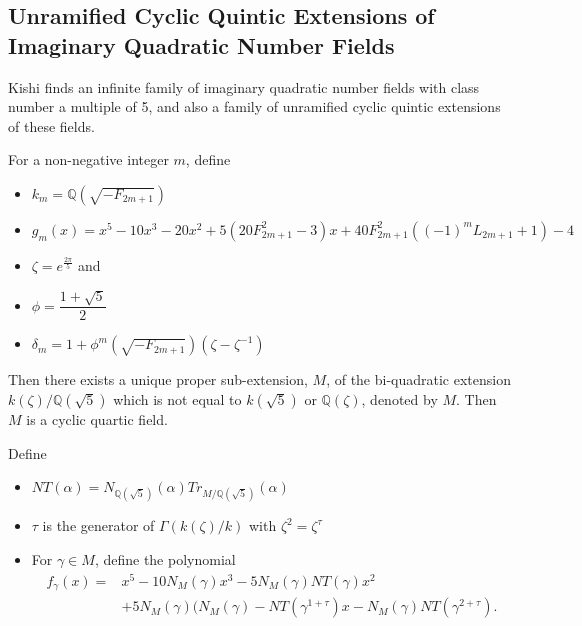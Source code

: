 \documentclass[12pt]{extarticle}
\newcommand{\Q}{\mathbb{Q}}
\newcommand{\<}{\langle}
\renewcommand{\>}{\rangle}
\theoremstyle{definition}
\begin{document}
\subsection{Unramified Cyclic Quintic Extensions of Imaginary Quadratic Number Fields}


Kishi \cite{KISH} finds an infinite family of imaginary quadratic number fields with class number a multiple of 5, and also a family of unramified cyclic quintic extensions of these fields. 

 For a non-negative integer $m$, define 
\begin{itemize}
\item $k_m = \Q(\sqrt{-F_{2m+1}})$ 
\item $ g_m(x) = x^5 - 10x^3  -20x^2 + 
    5(20F^2_{2m+1} - 3)x
    + 40F^2_{2m+1}((-1)^{m}L_{2m+1} + 1)- 4$
\item $\zeta = e^{\frac{2\pi}{5}}$ and 
\item $\phi = \dfrac{1+\sqrt{5}}{2}$
\item $\delta_m = 1+\phi^m(\sqrt{-F_{2m+1}})(\zeta-\zeta^{-1})$

\end{itemize}

Then there exists a unique proper sub-extension, $M$, of the bi-quadratic
extension \\ $k(\zeta)/\Q(\sqrt{5})$ which is not equal to 
$k(\sqrt{5})$ or $\Q(\zeta)$, denoted by $M$. Then $M$ is a cyclic quartic field. \par 
Define 
\begin{itemize}
\item $NT(\alpha) = N_{\Q(\sqrt{5})}(\alpha)Tr_{M/\Q(\sqrt{5})}(\alpha)$
\item $\tau$ is the generator of $\Gamma(k(\zeta)/k)$ with $\zeta^2=\zeta^\tau$
\item For $\gamma \in M$, define the polynomial 
\begin{equation}
\begin{split}
    f_\gamma(x) = {} & x^5 - 10N_M(\gamma)x^3  -5N_M(\gamma)NT (\gamma)x^2 \\ &
  + 5N_M(\gamma)(N_M(\gamma) 
  - NT(\gamma^{1+\tau})x 
  - N_M(\gamma)NT(\gamma^{2+\tau}) .
  \end{split}
\end{equation}
\end{itemize}
\end{document}
